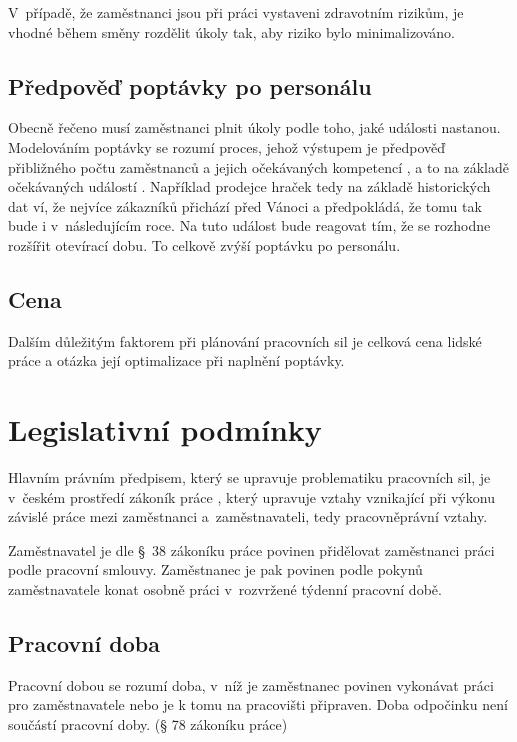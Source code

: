 \documentclass[twoside]{ctuthesis}
\begin{document}
V~případě, že zaměstnanci jsou při práci vystaveni zdravotním rizikům, je vhodné během směny rozdělit úkoly tak, aby riziko bylo minimalizováno. \cite{wongwien2013ergonomic}


\subsection{Předpověď poptávky po personálu}
\label{sub:demand}
Obecně řečeno musí zaměstnanci plnit úkoly podle toho, jaké události nastanou. Modelováním poptávky se rozumí proces, jehož výstupem je předpověď přibližného počtu zaměstnanců a jejich očekávaných kompetencí \cite[s.~219]{armstrong2014}, a to na základě očekávaných událostí \cite{ernst2004staff}.
Například prodejce hraček tedy na základě historických dat ví, že nejvíce zákazníků přichází před Vánoci a předpokládá, že tomu tak bude i v~následujícím roce. Na tuto událost bude reagovat tím, že se rozhodne rozšířit otevírací dobu. To celkově zvýší poptávku po personálu.

\subsection{Cena}
Dalším důležitým faktorem při plánování pracovních sil je celková cena lidské práce a otázka její optimalizace při naplnění poptávky.


\section{Legislativní podmínky}
\label{section:legislativa}
Hlavním právním předpisem, který se upravuje problematiku pracovních sil, je v~českém prostředí zákoník práce \cite{zakon06_262}, který upravuje vztahy vznikající při výkonu závislé práce mezi zaměstnanci a~zaměstnavateli, tedy pracovněprávní vztahy.

Zaměstnavatel je dle §~38 zákoníku práce povinen přidělovat zaměstnanci práci podle pracovní smlouvy. Zaměstnanec je pak povinen podle pokynů zaměstnavatele konat osobně práci v~rozvržené týdenní pracovní době.

\subsection{Pracovní doba}
Pracovní dobou se rozumí doba, v~níž je zaměstnanec povinen vykonávat práci pro zaměstnavatele nebo je k tomu na pracovišti připraven. Doba odpočinku není součástí pracovní doby. (§ 78 zákoníku práce)
\end{document}
